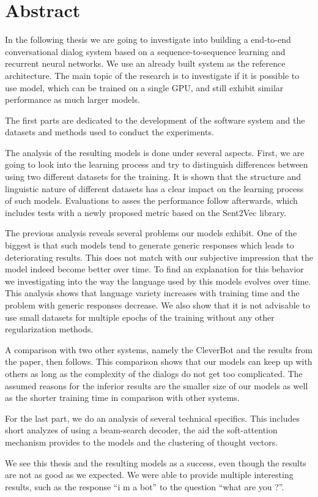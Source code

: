 \chapter*{Abstract}
In the following thesis we are going to investigate into building a end-to-end conversational dialog system based on a sequence-to-sequence learning and recurrent neural networks. We use an already built system as the reference architecture. The main topic of the research is to investigate if it is possible to use model, which can be trained on a single GPU, and still exhibit similar performance as much larger models.

The first parts are dedicated to the development of the software system and the datasets and methods used to conduct the experiments.

The analysis of the resulting models is done under several aspects. First, we are going to look into the learning process and try to distinguish differences between using two different datasets for the training. It is shown that the structure and linguistic nature of different datasets has a clear impact on the learning process of such models. Evaluations to asses the performance follow afterwards, which includes tests with a newly proposed metric based on the Sent2Vec library.

The previous analysis reveals several problems our models exhibit. One of the biggest is that such models tend to generate generic responses which leads to deteriorating results. This does not match with our subjective impression that the model indeed become better over time. To find an explanation for this behavior we investigating into the way the language used by this models evolves over time. This analysis shows that language variety increases with training time and the problem with generic responses decrease. We also show that it is not advisable to use small datasets for multiple epochs of the training without any other regularization methods.

A comparison with two other systems, namely the CleverBot and the results from the paper, then follows. This comparison shows that our models can keep up with others as long as the complexity of the dialogs do not get too complicated. The assumed reasons for the inferior results are the smaller size of our models as well as the shorter training time in comparison with other systems.

For the last part, we do an analysis of several technical specifics. This includes short analyzes of using a beam-search decoder, the aid the soft-attention mechanism provides to the models and the clustering of thought vectors. 

We see this thesis and the resulting models as a success, even though the results are not as good as we expected. We were able to provide multiple interesting results, such as the response ``i m a bot'' to the question ``what are you ?''.
